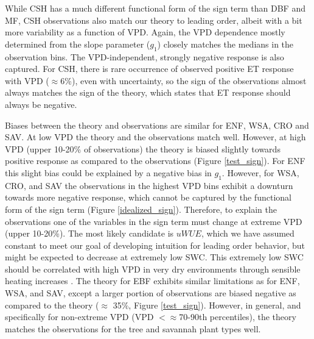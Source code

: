 While CSH has a much different functional form of the sign term than
DBF and MF, CSH observations also match our theory to leading order,
albeit with a bit more variability as a function of VPD. Again, the
VPD dependence mostly determined from the slope parameter ($g_1$)
closely matches the medians in the observation bins. The
VPD-independent, strongly negative response is also captured. For CSH,
there is rare occurrence of observed positive ET response with VPD
($\approx 6$\%), even with uncertainty, so the sign of the
observations almost always matches the sign of the theory, which
states that ET response should always be negative.

Biases between the theory and observations are similar for ENF, WSA,
CRO and SAV. At low VPD the theory and the observations match
well. However, at high VPD (upper 10-20\% of observations) the theory
is biased slightly towards positive response as compared to the
observations (Figure \ref{test_sign}). For ENF this slight bias could
be explained by a negative bias in $g_1$. However, for WSA, CRO, and
SAV the observations in the highest VPD bins exhibit a downturn
towards more negative response, which cannot be captured by the
functional form of the sign term (Figure
\ref{idealized_sign}). Therefore, to explain the observations one of
the variables in the sign term must change at extreme VPD (upper
10-20\%). The most likely candidate is $uWUE$, which we have assumed
constant to meet our goal of developing intuition for leading order
behavior, but might be expected to decrease at extremely low SWC. This extremely low SWC should be correlated with high VPD in very dry environments
through sensible heating increases \citep{Gentine_2016}. The theory
for EBF exhibits similar limitations as for ENF, WSA, and SAV, except
a larger portion of observations are biased negative as compared to
the theory ($\approx$ 35\%, Figure \ref{test_sign}). However, in
general, and specifically for non-extreme VPD (VPD  $< \approx$70-90th
percentiles), the theory matches the observations for the tree and
savannah plant types well.

